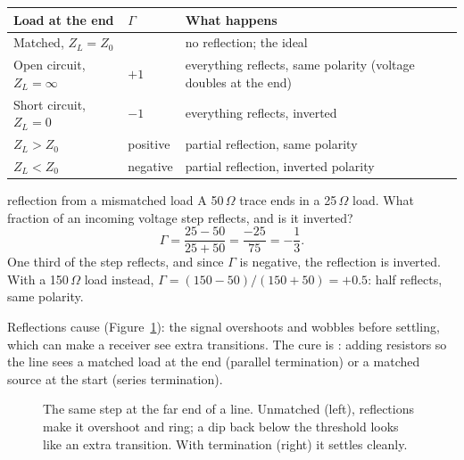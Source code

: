 \begin{center}
\begin{tabularx}{\linewidth}{>{\raggedright\arraybackslash}p{4.2cm}>{\raggedright\arraybackslash}p{1.6cm}>{\raggedright\arraybackslash}X}
\toprule
Load at the end & $\Gamma$ & What happens \\
\midrule
Matched, $Z_L = Z_0$ & 0 & no reflection; the ideal \\
Open circuit, $Z_L = \infty$ & $+1$ & everything reflects, same polarity (voltage doubles at the end) \\
Short circuit, $Z_L = 0$ & $-1$ & everything reflects, inverted \\
$Z_L > Z_0$ & positive & partial reflection, same polarity \\
$Z_L < Z_0$ & negative & partial reflection, inverted polarity \\
\bottomrule
\end{tabularx}
\end{center}

\begin{worked}{reflection from a mismatched load}
A 50\,$\Omega$ trace ends in a 25\,$\Omega$ load. What fraction of an incoming voltage step reflects, and is it inverted?
\[
  \Gamma = \frac{25 - 50}{25 + 50} = \frac{-25}{75} = -\frac13.
\]
One third of the step reflects, and since $\Gamma$ is negative, the reflection is inverted. With a 150\,$\Omega$ load instead, $\Gamma = (150-50)/(150+50) = +0.5$: half reflects, same polarity.
\end{worked}

Reflections cause  (Figure~\ref{fig:ringing}): the signal overshoots and wobbles before settling, which can make a receiver see extra transitions. The cure is : adding resistors so the line sees a matched load at the end (parallel termination) or a matched source at the start (series termination).

\begin{figure}[h]
\centering
{}
\caption{The same step at the far end of a line. Unmatched (left), reflections make it overshoot and ring; a dip back below the threshold looks like an extra transition. With termination (right) it settles cleanly.}
\label{fig:ringing}
\end{figure}

